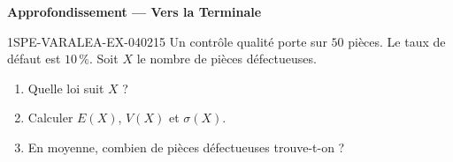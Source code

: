 \begin{center}\textbf{Approfondissement — Vers la Terminale}\end{center}
\begin{exercice}{1SPE-VARALEA-EX-040}{2}{15}
Un contrôle qualité porte sur $50$ pièces. Le taux de défaut est $10\,\%$. Soit $X$ le nombre de pièces défectueuses.

\begin{enumerate}
  \item Quelle loi suit $X$ ?
  \item Calculer $E(X)$, $V(X)$ et $\sigma(X)$.
  \item En moyenne, combien de pièces défectueuses trouve-t-on ?
\end{enumerate}
\end{exercice}
